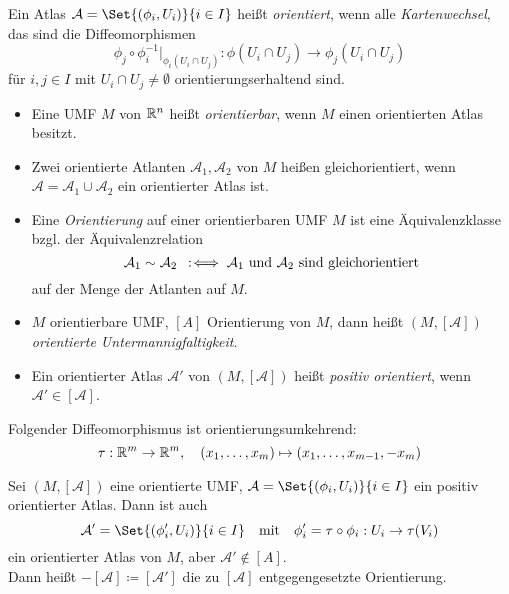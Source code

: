 \documentclass{cheat-sheet}
\newcommand{\Atlas}{\mathcal{A}} %
\theoremstyle{definition}
\begin{document}
\begin{defn}
  Ein Atlas $\Atlas = \Set{ (\phi_i, U_i) }{ i \in I }$ heißt \emph{orientiert}, wenn alle \emph{Kartenwechsel}, das sind die Diffeomorphismen
  \[ \phi_j \circ \phi_i^{-1} |_{\phi_i(U_i \cap U_j)} : \phi(U_i \cap U_j) \to \phi_j(U_i \cap U_j) \]
  für $i, j \in I$ mit $U_i \cap U_j \not= \emptyset$ orientierungserhaltend sind.
\end{defn}

\begin{defn}
  \begin{itemize}
    \item Eine UMF $M$ von $\mathbb{R}^n$ heißt \emph{orientierbar}, wenn $M$ einen orientierten Atlas besitzt.
    \item Zwei orientierte Atlanten $\Atlas_1, \Atlas_2$ von $M$ heißen gleichorientiert, wenn $\Atlas = \Atlas_1 \cup \Atlas_2$ ein orientierter Atlas ist.
    \item Eine \emph{Orientierung} auf einer orientierbaren UMF $M$ ist eine Äquivalenzklasse bzgl. der Äquivalenzrelation
    \[ \Atlas_1 \sim \Atlas_2 \coloniff \text{$\Atlas_1$ und $\Atlas_2$ sind gleichorientiert} \]
    auf der Menge der Atlanten auf $M$.
    \item $M$ orientierbare UMF, $[A]$ Orientierung von $M$, dann heißt $(M, [\Atlas])$ \emph{orientierte Untermannigfaltigkeit}.
    \item Ein orientierter Atlas $\Atlas'$ von $(M, [\Atlas])$ heißt \emph{positiv orientiert}, wenn $\Atlas' \in [\Atlas]$.
  \end{itemize}
\end{defn}


\begin{nota}
  Folgender Diffeomorphismus ist orientierungsumkehrend:
  \[ \tau : \mathbb{R}^m \to \mathbb{R}^m, \quad (x_1, \ldots, x_m) \mapsto (x_1, \ldots, x_{m-1}, - x_m) \]
\end{nota}

\begin{defn}
  Sei $(M, [\Atlas])$ eine orientierte UMF, $\Atlas = \Set{ (\phi_i, U_i) }{ i \in I }$ ein positiv orientierter Atlas. Dann ist auch
  \[
    \Atlas' = \Set{ (\phi_i', U_i) }{ i \in I }
    \quad \text{mit} \quad
    \phi_i' = \tau \circ \phi_i : U_i \to \tau(V_i)
  \]
  ein orientierter Atlas von $M$, aber $\Atlas' \not\in [A]$.\\
  Dann heißt $-[\Atlas] \coloneqq [\Atlas']$ die zu $[\Atlas]$ entgegengesetzte Orientierung.
\end{defn}
\end{document}
